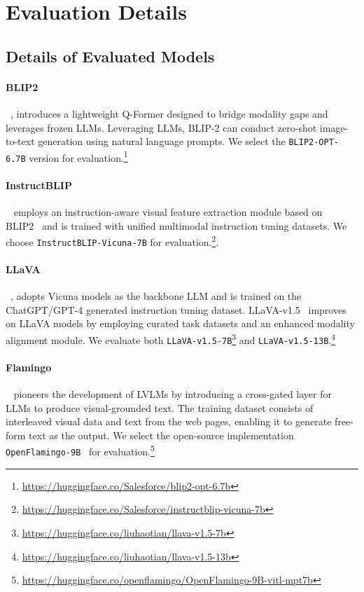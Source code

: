 \section{Evaluation Details}
\label{apx:evaluation_details}
\subsection{Details of Evaluated Models}


\paragraph{BLIP2}~\citep{li2023blip2}, 
introduces a lightweight Q-Former designed to bridge modality gaps and leverages frozen LLMs. Leveraging LLMs, BLIP-2 can conduct zero-shot image-to-text generation using natural language prompts. We select the \texttt{BLIP2-OPT-6.7B} version for evaluation.\footnote{\url{https://huggingface.co/Salesforce/blip2-opt-6.7b}}


\paragraph{InstructBLIP}~\citep{dai2023instructblip} employs an instruction-aware visual feature extraction module based on BLIP2~\citep{li2023blip2} and is trained with unified multimodal instruction tuning datasets. We choose \texttt{InstructBLIP-Vicuna-7B} for evaluation.\footnote{\url{https://huggingface.co/Salesforce/instructblip-vicuna-7b}}.



\paragraph{LLaVA}~\citep{liu2023llava},
adopts Vicuna models as the backbone LLM and is trained on the ChatGPT/GPT-4 generated instruction tuning dataset.
LLaVA-v1.5~\citep{liu2023llava15} improves on LLaVA models by employing curated task datasets and an enhanced modality alignment module.
We evaluate both \texttt{LLaVA-v1.5-7B}\footnote{\url{https://huggingface.co/liuhaotian/llava-v1.5-7b}} and \texttt{LLaVA-v1.5-13B}.\footnote{\url{https://huggingface.co/liuhaotian/llava-v1.5-13b}}


\paragraph{Flamingo}~\citep{Alayrac2022FlamingoAV} pioneers the development of LVLMs by introducing a cross-gated layer for LLMs to produce visual-grounded text. The training dataset
consists of interleaved visual data and text from the web pages, enabling it to generate free-form text as the output. We select the open-source implementation \texttt{OpenFlamingo-9B}~\citep{awadalla2023openflamingo} for evaluation.\footnote{\url{https://huggingface.co/openflamingo/OpenFlamingo-9B-vitl-mpt7b}}

